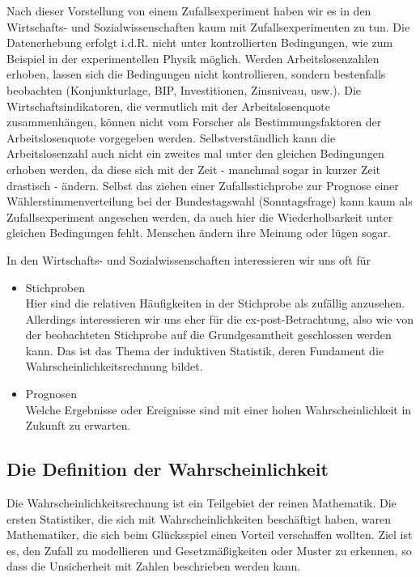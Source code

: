Nach dieser Vorstellung von einem Zufallsexperiment haben wir es in den Wirtschafts- und Sozialwissenschaften kaum mit Zufallsexperimenten zu tun. Die Datenerhebung erfolgt i.d.R. nicht unter kontrollierten Bedingungen, wie zum Beispiel in der experimentellen Physik möglich. Werden Arbeitslosenzahlen erhoben, lassen sich die Bedingungen nicht kontrollieren, sondern bestenfalls beobachten (Konjunkturlage, BIP, Investitionen, Zinsniveau, usw.). Die Wirtschaftsindikatoren, die vermutlich mit der Arbeitslosenquote zusammenhängen, können nicht vom Forscher als Bestimmungsfaktoren der Arbeitslosenquote vorgegeben werden. Selbstverständlich kann die Arbeitslosenzahl auch nicht ein zweites mal unter den gleichen Bedingungen erhoben werden, da diese sich mit der Zeit - manchmal sogar in kurzer Zeit drastisch - ändern. Selbst das ziehen einer Zufallsstichprobe zur Prognose einer Wählerstimmenverteilung bei der Bundestagswahl (Sonntagsfrage) kann kaum als Zufallsexperiment angesehen werden, da auch hier die Wiederholbarkeit unter gleichen Bedingungen fehlt. Menschen ändern ihre Meinung oder lügen sogar. 

In den Wirtschafts- und Sozialwissenschaften interessieren wir uns oft für  
\begin{itemize}
	\item Stichproben \\Hier sind die relativen Häufigkeiten in der Stichprobe als zufällig anzusehen. Allerdings interessieren wir uns eher für die ex-post-Betrachtung, also wie von der beobachteten Stichprobe auf die Grundgesamtheit geschlossen werden kann. Das ist das Thema der induktiven Statistik, deren Fundament die Wahrscheinlichkeitsrechnung bildet.
	\item Prognosen\\ 
	Welche Ergebnisse oder Ereignisse sind mit einer hohen Wahrscheinlichkeit in Zukunft zu erwarten.
\end{itemize}

\subsection{Die Definition der Wahrscheinlichkeit}

Die Wahrscheinlichkeitsrechnung ist ein Teilgebiet der reinen Mathematik. Die ersten Statistiker, die sich mit Wahrscheinlichkeiten beschäftigt haben, waren Mathematiker, die sich beim Glücksspiel einen Vorteil verschaffen wollten. Ziel ist es, den Zufall zu modellieren und Gesetzmäßigkeiten oder Muster zu erkennen, so dass die Unsicherheit mit Zahlen beschrieben werden kann.

